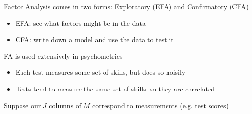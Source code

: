 \documentclass[aspectratio=169]{beamer}
\begin{document}
\begin{frame}

Factor Analysis comes in two forms: Exploratory (EFA) and Confirmatory (CFA)

\bigskip{}

\begin{itemize}
\itemsep1.5em
\item<2-> EFA: see what factors might be in the data

\item<3-> CFA: write down a model and use the data to test it
\end{itemize}

\bigskip{}


\bigskip{}

\end{frame}

\begin{frame}

FA is used extensively in psychometrics
\bigskip{}


\bigskip{}

\begin{itemize}
\itemsep1.5em
\item<3-> Each test measures some set of skills, but does so noisily

\item<4-> Tests tend to measure the same set of skills, so they are correlated
\end{itemize}

\end{frame}

\begin{frame}

Suppose our $J$ columns of $M$ correspond to measurements (e.g. test scores)

\bigskip{}


\bigskip{}


\bigskip{}

\bigskip{}

\bigskip{}


\end{frame}
\end{document}

